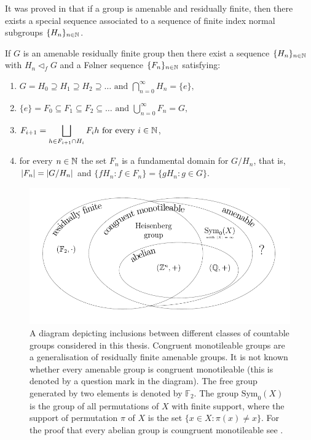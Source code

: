It was proved in \cite{CP14} that if a group is amenable and residually finite, then there exists a special \Folner sequence associated to a sequence of finite index normal subgroups $\{H_n\}_{n\in\mathbb{N}}$.

\begin{lem}\label{Cortez}\cite[Lemma 4]{CP14}
If $G$ is an amenable residually finite group then there exist
a sequence $\{H_n\}_{n\in \mathbb{N}}$ with $H_n\lhd_f G$ and  a F{\o}lner sequence $\{F_n\}_{n\in\mathbb{N}}$ satisfying:
\begin{enumerate}
\item $\displaystyle G=H_0\supseteq H_1\supseteq H_2\supseteq\ldots\text{ and }\bigcap_{n=0}^{\infty}H_n=\{e\},$
\item $\displaystyle\{e\}=F_0\subseteq F_1\subseteq F_2\subseteq\ldots\text{ and }\bigcup_{n=0}^{\infty}F_n=G,$
\item\label{problem} $\displaystyle F_{i+1}=\bigsqcup_{h\in F_{i+1}\cap H_{i}}F_ih\text{ for every }i\in\mathbb{N}$,
\item for every $n\in\mathbb{N}$ the set $F_n$ is a fundamental domain for $G/H_{n}$, that is, $|F_n|=\left|G/H_n\right|$ and $\{fH_n:f\in F_n\}=\{gH_n:g\in G\}$.
\end{enumerate}
\end{lem}

\begin{figure}
\centering
\includegraphics[scale=1]{Graphics/grupy}
\caption{A diagram depicting inclusions between different classes of countable groups considered in this thesis. Congruent monotileable groups are a generalisation of residually finite amenable groups. It is not known whether every amenable group is congruent monotileable (this is denoted by a question mark in the diagram). The free group generated by two elements is denoted by $\mathbb{F}_2$. The group $\text{Sym}_0(X)$ is the group of all permutations of $X$ with finite support, where the support of permutation $\pi$ of $X$ is the set $\{x\in X : \pi(x)\neq x \}$. For the proof that every abelian group is coungruent monotileable see \cite{CC19}.}\label{fig:groups}
\end{figure}

